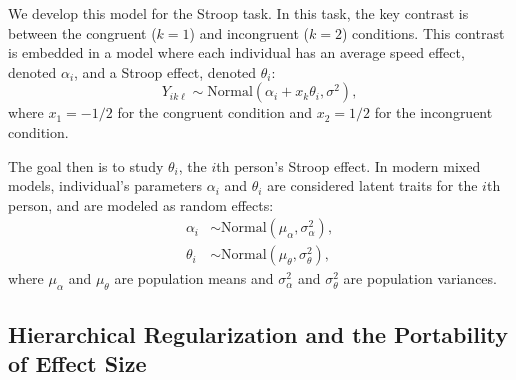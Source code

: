 \documentclass[english,man]{apa6}
\theoremstyle{definition}
\theoremstyle{definition}
\theoremstyle{definition}
\theoremstyle{remark}
\begin{document}
We develop this model for the Stroop task. In this task, the key
contrast is between the congruent (\(k=1\)) and incongruent (\(k=2\))
conditions. This contrast is embedded in a model where each individual
has an average speed effect, denoted \(\alpha_i\), and a Stroop effect,
denoted \(\theta_i\): \[
Y_{ik\ell} \sim \mbox{Normal}(\alpha_{i}+x_k\theta_{i},\sigma^2),
\] where \(x_1=-1/2\) for the congruent condition and \(x_2=1/2\) for
the incongruent condition.

The goal then is to study \(\theta_i\), the \(i\)th person's Stroop
effect. In modern mixed models, individual's parameters \(\alpha_i\) and
\(\theta_i\) are considered latent traits for the \(i\)th person, and
are modeled as random effects: \[
\begin{aligned}
\alpha_i &\sim \mbox{Normal}(\mu_\alpha,\sigma^2_\alpha),\\
\theta_i &\sim \mbox{Normal}(\mu_\theta,\sigma^2_\theta),
\end{aligned}
\] where \(\mu_\alpha\) and \(\mu_\theta\) are population means and
\(\sigma^2_\alpha\) and \(\sigma^2_\theta\) are population variances.

\subsection{Hierarchical Regularization and the Portability of Effect
Size}\label{hierarchical-regularization-and-the-portability-of-effect-size}
\end{document}
